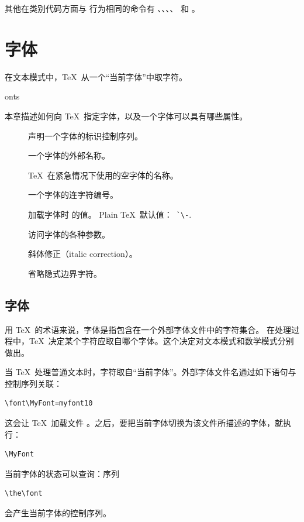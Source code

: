 \documentclass[a4paper]{rapport3}
\newenvironment{inventory}{\begin{description}}{\end{description}}
\def\term#1\par{\index{#1}}
\begin{document}
其他在类别代码方面与  行为相同的命令有 、、、、 和 。





\endofchapter
\chapter{字体}\label{font}

在文本模式中，\TeX\ 从一个“当前字体”中取字符。
\term fonts\par
本章描述如何向 \TeX\ 指定字体，以及一个字体可以具有哪些属性。

\begin{inventory}
\item [] 
      声明一个字体的标识控制序列。

\item []
      一个字体的外部名称。

\item []
      \TeX\ 在紧急情况下使用的空字体的名称。


\item []
      一个字体的连字符编号。

\item []
      加载字体时  的值。
      Plain \TeX\ 默认值：~\verb>`\->.

\item []
      访问字体的各种参数。

\item []
      斜体修正（italic correction）。

\item []
      省略隐式边界字符。
\end{inventory}

\section{字体}

用 \TeX\ 的术语来说，字体是指包含在一个外部字体文件中的字符集合。
在处理过程中，\TeX\ 决定某个字符应取自哪个字体。这个决定对文本模式和数学模式分别做出。

当 \TeX\ 处理普通文本时，字符取自“当前字体”。外部字体文件名通过如下语句与控制序列关联：
\begin{verbatim}
\font\MyFont=myfont10
\end{verbatim}
这会让 \TeX\ 加载文件 。之后，要把当前字体切换为该文件所描述的字体，就执行：
\begin{verbatim}
\MyFont
\end{verbatim}
当前字体的状态可以查询：序列
\begin{verbatim}
\the\font
\end{verbatim}
会产生当前字体的控制序列。
\end{document}
